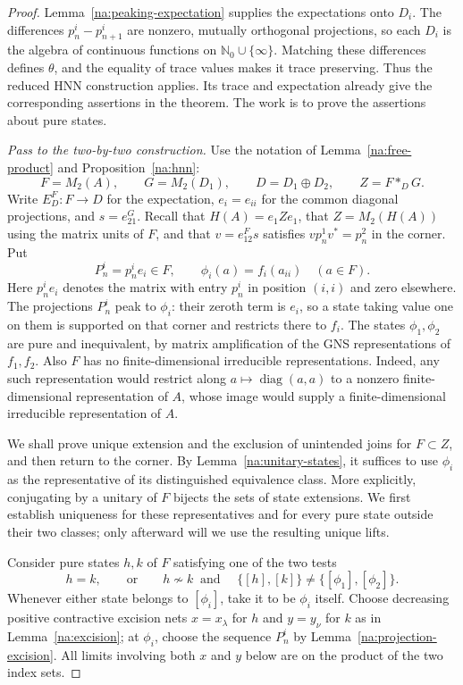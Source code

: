 \begin{proof}
Lemma~\ref{na:peaking-expectation} supplies the expectations onto $D_i$.
The differences $p_n^i-p_{n+1}^i$ are nonzero, mutually orthogonal
projections, so each $D_i$ is the algebra of continuous functions on
$\mathbb N_0\cup\{\infty\}$. Matching these differences defines
$\theta$, and the equality of trace values makes it trace preserving.
Thus the reduced HNN construction applies. Its trace and expectation
already give the corresponding assertions in the theorem. The work
is to prove the assertions about pure states.

\medskip\noindent
\emph{Pass to the two-by-two construction.}
Use the notation of Lemma~\ref{na:free-product} and
Proposition~\ref{na:hnn}:
\[
 F=M_2(A),\qquad G=M_2(D_1),\qquad D=D_1\oplus D_2,
 \qquad Z=F*_D G.
\]
Write $E_D^F:F\to D$ for the expectation, $e_i=e_{ii}$ for the
common diagonal projections, and $s=e_{21}^G$. Recall that
$H(A)=e_1Ze_1$, that $Z=M_2(H(A))$ using the matrix units of $F$,
and that $v=e_{12}^F s$ satisfies $vp_n^1v^*=p_n^2$ in the corner.
Put
\[
 P_n^i=p_n^i e_i\in F,\qquad \phi_i(a)=f_i(a_{ii})\quad(a\in F).
\]
Here $p_n^i e_i$ denotes the matrix with entry $p_n^i$ in position
$(i,i)$ and zero elsewhere. The projections $P_n^i$ peak to $\phi_i$:
their zeroth term is $e_i$, so a state taking value one on them is
supported on that corner and restricts there to $f_i$. The states
$\phi_1,\phi_2$ are pure and inequivalent, by matrix amplification of
the GNS representations of $f_1,f_2$.
Also $F$ has no finite-dimensional irreducible representations. Indeed,
any such representation would restrict along $a\mapsto\operatorname{diag}(a,a)$
to a nonzero finite-dimensional representation of $A$, whose image
would supply a finite-dimensional irreducible representation of $A$.

We shall prove unique extension and the exclusion of unintended joins
for $F\subset Z$, and then return to the corner. By
Lemma~\ref{na:unitary-states}, it suffices to use $\phi_i$ as the
representative of its distinguished equivalence class. More explicitly,
conjugating by a unitary of $F$ bijects the sets of state extensions.
We first establish uniqueness for these representatives and for every
pure state outside their two classes; only afterward will we use the
resulting unique lifts.

Consider pure states $h,k$ of $F$ satisfying one of the two tests
\begin{equation}\label{eq:bridge-tests}
 h=k,
 \qquad\text{or}\qquad
 h\not\sim k\ \text{ and }\quad
 \{[h],[k]\}\ne\{[\phi_1],[\phi_2]\}.
\end{equation}
Whenever either state belongs to $[\phi_i]$, take it to be $\phi_i$
itself. Choose decreasing positive contractive excision nets
$x=x_\lambda$ for $h$ and $y=y_\nu$ for $k$ as in
Lemma~\ref{na:excision}; at $\phi_i$, choose the sequence $P_n^i$
by Lemma~\ref{na:projection-excision}.
All limits involving both $x$ and $y$ below are on the product of the
two index sets.


\end{proof}
